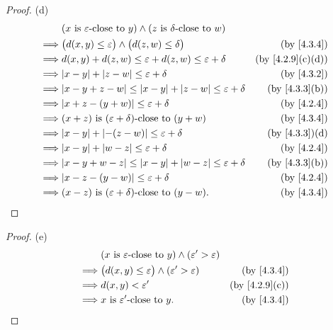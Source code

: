 \begin{proof}{(d)}
  \begin{align*}
             & (x \text{ is \(\varepsilon\)-close to } y) \land (z \text{ is \(\delta\)-close to } w)                                  \\
    \implies & \big(d(x, y) \leq \varepsilon\big) \land \big(d(z, w) \leq \delta\big)                 & \text{(by \cref{4.3.4})}       \\
    \implies & d(x, y) + d(z, w) \leq \varepsilon + d(z, w) \leq \varepsilon + \delta                 & \text{(by \cref{4.2.9}(c)(d))} \\
    \implies & \abs{x - y} + \abs{z - w} \leq \varepsilon + \delta                                    & \text{(by \cref{4.3.2})}       \\
    \implies & \abs{x - y + z - w} \leq \abs{x - y} + \abs{z - w} \leq \varepsilon + \delta           & \text{(by \cref{4.3.3}(b))}    \\
    \implies & \abs{x + z - (y + w)} \leq \varepsilon + \delta                                        & \text{(by \cref{4.2.4})}       \\
    \implies & (x + z) \text{ is \((\varepsilon + \delta)\)-close to } (y + w)                        & \text{(by \cref{4.3.4})}       \\
    \implies & \abs{x - y} + \abs{-(z - w)} \leq \varepsilon + \delta                                 & \text{(by \cref{4.3.3})(d)}    \\
    \implies & \abs{x - y} + \abs{w - z} \leq \varepsilon + \delta                                    & \text{(by \cref{4.2.4})}       \\
    \implies & \abs{x - y + w - z} \leq \abs{x - y} + \abs{w - z} \leq \varepsilon + \delta           & \text{(by \cref{4.3.3}(b))}    \\
    \implies & \abs{x - z - (y - w)} \leq \varepsilon + \delta                                        & \text{(by \cref{4.2.4})}       \\
    \implies & (x - z) \text{ is \((\varepsilon + \delta)\)-close to } (y - w).                       & \text{(by \cref{4.3.4})}
  \end{align*}
\end{proof}

\begin{proof}{(e)}
  \begin{align*}
             & (x \text{ is \(\varepsilon\)-close to } y) \land (\varepsilon' > \varepsilon)                               \\
    \implies & \big(d(x, y) \leq \varepsilon\big) \land (\varepsilon' > \varepsilon)         & \text{(by \cref{4.3.4})}    \\
    \implies & d(x, y) < \varepsilon'                                                        & \text{(by \cref{4.2.9}(c))} \\
    \implies & x \text{ is \(\varepsilon'\)-close to } y.                                    & \text{(by \cref{4.3.4})}
  \end{align*}
\end{proof}

